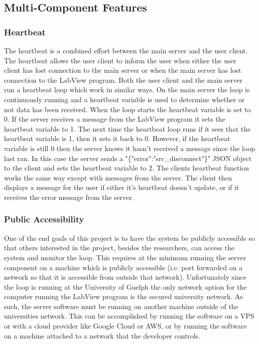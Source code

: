 \documentclass[10pt,technote]{IEEEtran}
\begin{document}
\subsection{Multi-Component Features}
\subsubsection{Heartbeat}
The heartbeat is a combined effort between the main server and the user client. The heartbeat allows the user client to inform the user when either the user client has lost connection to the main server or when the main server has lost connection to the LabView program. Both the user client and the main server run a heartbeat loop which work in similar ways. On the main server the loop is continuously running and a heartbeat variable is used to determine whether or not data has been received. When the loop starts the heartbeat variable is set to 0. If the server receives a message from the LabView program it sets the heartbeat variable to 1. The next time the heartbeat loop runs if it sees that the heartbeat variable is 1, then it sets it back to 0. However, if the heartbeat variable is still 0 then the server knows it hasn't received a message since the loop last ran. In this case the server sends a "\{"error":"src\_disconnect"\}" JSON object to the client and sets the heartbeat variable to 2. The clients heartbeat function works the same way except with messages from the server. The client then displays a message for the user if either it's heartbeat doesn't update, or if it receives the error message from the server.
\subsubsection{Public Accessibility}
One of the end goals of this project is to have the system be publicly accessible so that others interested in the project, besides the researchers, can access the system and monitor the loop. This requires at the minimum running the server component on a machine which is publicly accessible (i.e. port forwarded on a network so that it is accessible from outside that network). Unfortunately since the loop is running at the University of Guelph the only network option for the computer running the LabView program is the secured university network. As such, the server software must be running on another machine outside of the universities network. This can be accomplished by running the software on a VPS or with a cloud provider like Google Cloud or AWS, or by running the software on a machine attached to a network that the developer controls.
\end{document}
